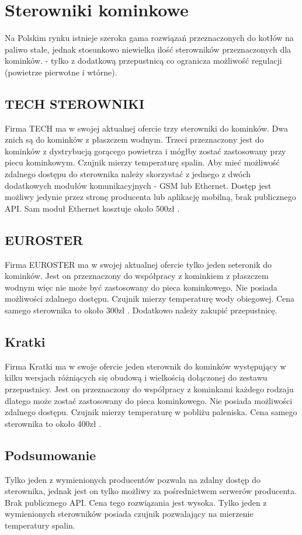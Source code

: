 \documentclass[11pt]{report}
\begin{document}
 \section{Sterowniki kominkowe}
 Na Polskim rynku istnieje szeroka gama rozwiązań przeznaczonych do kotłów na paliwo stałe, jednak stosunkowo niewielka ilość sterowników przeznaczonych dla kominków. - tylko z dodatkową przepustnicą co ogranicza możliwość regulacji (powietrze pierwotne i wtórne).
 \subsection{TECH STEROWNIKI}
 Firma TECH ma w swojej aktualnej ofercie \cite{Tech} trzy sterowniki do kominków. Dwa znich są do kominków z płaszczem wodnym. Trzeci \cite{TechSterownik} przeznaczony jest do kominków z dystrybucją gorącego powietrza i mógłby zostać zastosowany przy piecu kominkowym. Czujnik mierzy temperaturę spalin.
 Aby mieć możliwość zdalnego dostępu do sterownika należy skorzystać z jednego z dwóch dodatkowych modułów komunikacyjnych - GSM lub Ethernet. Dostęp jest możliwy jedynie przez stronę producenta lub aplikację mobilną, brak publicznego API.
 Sam moduł Ethernet kosztuje około 500zł \cite{TechEthernetCena}.
 \subsection{EUROSTER}
 Firma EUROSTER ma w swojej aktualnej ofercie \cite{Euroster} tylko jeden seteronik do kominków. Jest on \cite{EurosterSterownik} przeznaczony do współpracy z kominkiem z płaszczem wodnym więc nie może być zastosowany do pieca kominkowego. Nie posiada możliwości zdalnego dostępu. Czujnik mierzy temperaturę wody obiegowej.
 Cena samego sterownika to około 300zł \cite{EurosterSterownikCena}. Dodatkowo należy zakupić przepustnicę.
 \subsection{Kratki}
 Firma Kratki ma w swoje ofercie \cite{Kratki} jeden sterownik do kominków występujący w kilku wersjach różniących się obudową i wielkością dołączonej do zestawu przepustnicy.
 Jest on przeznaczony do współpracy z kominkami każdego rodzaju dlatego może zostać zastosowany do pieca kominkowego. Nie posiada możliwości zdalnego dostępu. Czujnik mierzy temperaturę w pobliżu paleniska. 
 Cena samego sterownika to około 400zł \cite{KratkiSterownik}.
  \subsection{Podsumowanie}
  Tylko jeden z wymienionych producentów pozwala na zdalny dostęp do sterownika, jednak jest on tylko możliwy za pośrednictwem serwerów producenta. Brak publicznego API. Cena tego rozwiązania jest wysoka.
  Tylko jeden z wymienionych sterowników posiada czujnik pozwalający na mierzenie temperatury spalin.
  
\end{document}

